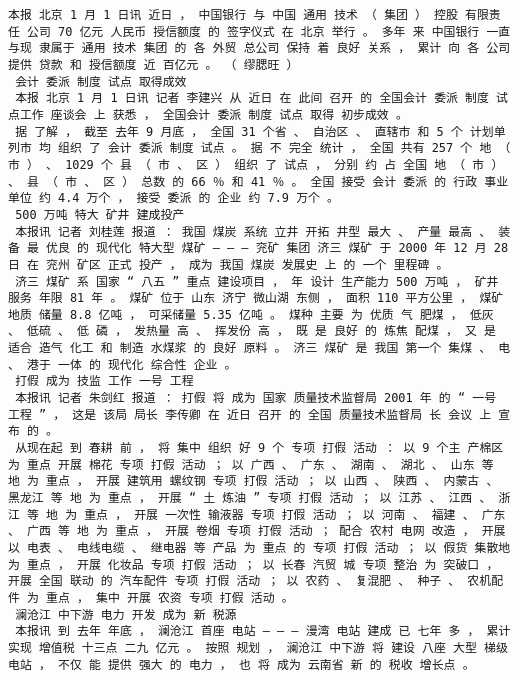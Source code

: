 \documentclass{article}
\begin{document}
\begin{Verbatim}[commandchars=\\\{\}]
 本报 北京 1 月 1 日讯 近日 ， 中国银行 与 中国 通用 技术 （ 集团 ） 控股 有限责任 公司 70 亿元 人民币 授信额度 的 签字仪式 在 北京 举行 。 多年 来 中国银行 一直 与现 隶属于 通用 技术 集团 的 各 外贸 总公司 保持 着 良好 关系 ， 累计 向 各 公司 提供 贷款 和 授信额度 近 百亿元 。 （ 缪腮旺 ） 
 会计 委派 制度 试点 取得成效 
 本报 北京 1 月 1 日讯 记者 李建兴 从 近日 在 此间 召开 的 全国会计 委派 制度 试点工作 座谈会 上 获悉 ， 全国会计 委派 制度 试点 取得 初步成效 。 
 据 了解 ， 截至 去年 9 月底 ， 全国 31 个省 、 自治区 、 直辖市 和 5 个 计划单列市 均 组织 了 会计 委派 制度 试点 。 据 不 完全 统计 ， 全国 共有 257 个 地 （ 市 ） 、 1029 个 县 （ 市 、 区 ） 组织 了 试点 ， 分别 约 占 全国 地 （ 市 ） 、 县 （ 市 、 区 ） 总数 的 66 ％ 和 41 ％ 。 全国 接受 会计 委派 的 行政 事业单位 约 4.4 万个 ， 接受 委派 的 企业 约 7.9 万个 。 
 500 万吨 特大 矿井 建成投产 
 本报讯 记者 刘桂莲 报道 ： 我国 煤炭 系统 立井 开拓 井型 最大 、 产量 最高 、 装备 最 优良 的 现代化 特大型 煤矿 — — — 兖矿 集团 济三 煤矿 于 2000 年 12 月 28 日 在 兖州 矿区 正式 投产 ， 成为 我国 煤炭 发展史 上 的 一个 里程碑 。 
 济三 煤矿 系 国家 “ 八五 ” 重点 建设项目 ， 年 设计 生产能力 500 万吨 ， 矿井 服务 年限 81 年 。 煤矿 位于 山东 济宁 微山湖 东侧 ， 面积 110 平方公里 ， 煤矿 地质 储量 8.8 亿吨 ， 可采储量 5.35 亿吨 。 煤种 主要 为 优质 气 肥煤 ， 低灰 、 低硫 、 低 磷 ， 发热量 高 、 挥发份 高 ， 既 是 良好 的 炼焦 配煤 ， 又 是 适合 造气 化工 和 制造 水煤浆 的 良好 原料 。 济三 煤矿 是 我国 第一个 集煤 、 电 、 港于 一体 的 现代化 综合性 企业 。 
 打假 成为 技监 工作 一号 工程 
 本报讯 记者 朱剑红 报道 ： 打假 将 成为 国家 质量技术监督局 2001 年 的 “ 一号 工程 ” ， 这是 该局 局长 李传卿 在 近日 召开 的 全国 质量技术监督局 长 会议 上 宣布 的 。 
 从现在起 到 春耕 前 ， 将 集中 组织 好 9 个 专项 打假 活动 ： 以 9 个主 产棉区 为 重点 开展 棉花 专项 打假 活动 ； 以 广西 、 广东 、 湖南 、 湖北 、 山东 等 地 为 重点 ， 开展 建筑用 螺纹钢 专项 打假 活动 ； 以 山西 、 陕西 、 内蒙古 、 黑龙江 等 地 为 重点 ， 开展 “ 土 炼油 ” 专项 打假 活动 ； 以 江苏 、 江西 、 浙江 等 地 为 重点 ， 开展 一次性 输液器 专项 打假 活动 ； 以 河南 、 福建 、 广东 、 广西 等 地 为 重点 ， 开展 卷烟 专项 打假 活动 ； 配合 农村 电网 改造 ， 开展 以 电表 、 电线电缆 、 继电器 等 产品 为 重点 的 专项 打假 活动 ； 以 假货 集散地 为 重点 ， 开展 化妆品 专项 打假 活动 ； 以 长春 汽贸 城 专项 整治 为 突破口 ， 开展 全国 联动 的 汽车配件 专项 打假 活动 ； 以 农药 、 复混肥 、 种子 、 农机配件 为 重点 ， 集中 开展 农资 专项 打假 活动 。 
 澜沧江 中下游 电力 开发 成为 新 税源 
 本报讯 到 去年 年底 ， 澜沧江 首座 电站 — — — 漫湾 电站 建成 已 七年 多 ， 累计 实现 增值税 十三点 二九 亿元 。 按照 规划 ， 澜沧江 中下游 将 建设 八座 大型 梯级 电站 ， 不仅 能 提供 强大 的 电力 ， 也 将 成为 云南省 新 的 税收 增长点 。 

\end{Verbatim}
\end{document}
